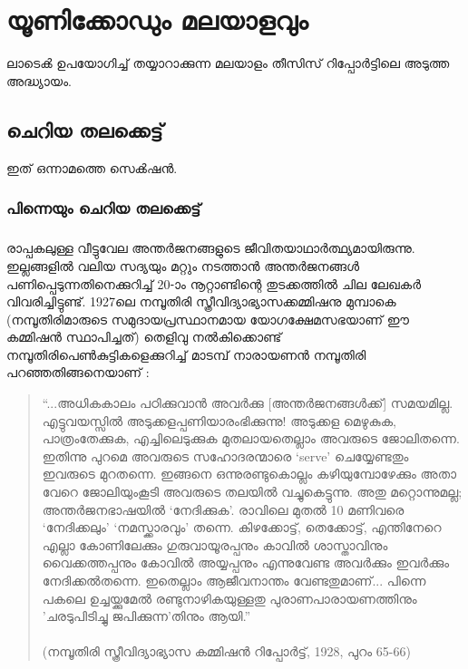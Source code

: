 \chapter{യൂണിക്കോഡും മലയാളവും}
ലാടെൿ ഉപയോഗിച്ച് തയ്യാറാക്കുന്ന മലയാളം തീസിസ് റിപ്പോർട്ടിലെ അടുത്ത അദ്ധ്യായം.

\section{ചെറിയ തലക്കെട്ട്}

ഇത് ഒന്നാമത്തെ സെൿഷൻ.

\subsection{പിന്നെയും ചെറിയ തലക്കെട്ട്}
\paragraph{}രാപ്പകലുള്ള വീട്ടുവേല അന്തർജനങ്ങളുടെ ജീവിതയാഥാർത്ഥ്യമായിരുന്നു. ഇല്ലങ്ങളിൽ വലിയ സദ്യയും മറ്റും നടത്താൻ അന്തർജനങ്ങൾ പണിപ്പെടുന്നതിനെക്കുറിച്ച് 20-ാം നൂറ്റാണ്ടിന്റെ തുടക്കത്തിൽ ചില ലേഖകർ വിവരിച്ചിട്ടുണ്ട്. 1927ലെ നമ്പൂതിരി സ്ത്രീവിദ്യാഭ്യാസക്കമ്മിഷനു മുമ്പാകെ (നമ്പൂതിരിമാരുടെ സമുദായപ്രസ്ഥാനമായ യോഗക്ഷേമസഭയാണ് ഈ കമ്മിഷൻ സ്ഥാപിച്ചത്) തെളിവു നൽകിക്കൊണ്ട് നമ്പൂതിരിപെൺകുട്ടികളെക്കുറിച്ച് മാടമ്പ് നാരായണൻ നമ്പൂതിരി പറഞ്ഞതിങ്ങനെയാണ് \cite{devika}:

\begin{quotation}
 ``...അധികകാലം പഠിക്കുവാൻ അവർക്കു [അന്തർജനങ്ങൾക്ക്] സമയമില്ല. എട്ടുവയസ്സിൽ അടുക്കളപ്പണിയാരംഭിക്കുന്നു! അടുക്കള മെഴുകുക, പാത്രംതേക്കുക, എച്ചിലെടുക്കുക മുതലായതെല്ലാം അവരുടെ ജോലിതന്നെ. ഇതിന്നു പുറമെ അവരുടെ സഹോദരന്മാരെ `serve' ചെയ്യേണ്ടതും ഇവരുടെ മുറതന്നെ. ഇങ്ങനെ ഒന്നുരണ്ടുകൊല്ലം കഴിയുമ്പോഴേക്കും അതാ വേറെ ജോലിയുംകൂടി അവരുടെ തലയിൽ വച്ചുകെട്ടുന്നു. അതു മറ്റൊന്നുമല്ല; അന്തർജനഭാഷയിൽ `നേദിക്കുക'. രാവിലെ മുതൽ 10 മണിവരെ `നേദിക്കലും' `നമസ്ക്കാരവും' തന്നെ. കിഴക്കോട്ട്, തെക്കോട്ട്, എന്തിനേറെ എല്ലാ കോണിലേക്കും ഗുരുവായൂരപ്പനും കാവിൽ ശാസ്താവിനും വൈക്കത്തപ്പനും കോവിൽ അയ്യപ്പനും എന്നുവേണ്ട അവർക്കും ഇവർക്കും നേദിക്കൽതന്നെ. ഇതെല്ലാം ആജീവനാന്തം വേണ്ടതുമാണ്... പിന്നെ പകലെ ഉച്ചയ്ക്കുമേൽ രണ്ടുനാഴികയുള്ളതു പുരാണപാരായണത്തിനും 'ചരടുപിടിച്ചു ജപിക്കുന്ന'തിനും ആയി.'' \\
\\(നമ്പൂതിരി സ്ത്രീവിദ്യാഭ്യാസ കമ്മിഷൻ റിപ്പോർട്ട്, 1928, പുറം 65-66)
\end{quotation}
 

